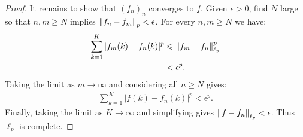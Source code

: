 \begin{proof}
            It remains to show that $(f_n)_n$ converges to $f$. Given $\epsilon > 0$, find $N$ large so that $n,m \geq N$ implies $\left\lVert f_n - f_m \right\rVert_p < \epsilon$. For every $n,m \geq N$ we have:
                \begin{equation*}
                \begin{split}
                    \sum_{k = 1}^K |f_m(k) - f_n(k)|^p 
                    & \leqslant \left\lVert f_m - f_n \right\rVert_{\ell_p}^p \\
                    & < \epsilon^p.
                \end{split}
                \end{equation*}
            Taking the limit as $m \rightarrow \infty$ and considering all $n \geq N$ gives:
                \begin{equation*}
                \begin{split}
                    \sum_{k = 1}^K |f(k) - f_n(k)|^p < \epsilon^p.
                \end{split}
                \end{equation*}
            Finally, taking the limit as $K \rightarrow \infty$ and simplifying gives $\left\lVert f - f_n \right\rVert_{\ell_p} < \epsilon$. Thus $\ell_p$ is complete.
        \end{proof}

